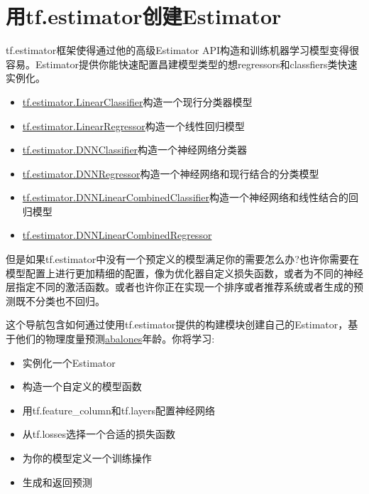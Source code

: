 \section{用tf.estimator创建Estimator}
tf.estimator框架使得通过他的高级Estimator API构造和训练机器学习模型变得很容易。Estimator提供你能快速配置昌建模型类型的想regressors和classfiers类快速实例化。
\begin{itemize}
	\item \href{https://www.tensorflow.org/api_docs/python/tf/estimator/LinearClassifier}{tf.estimator.LinearClassifier}构造一个现行分类器模型
	\item \href{https://www.tensorflow.org/api_docs/python/tf/estimator/LinearRegressor}{tf.estimator.LinearRegressor}构造一个线性回归模型
	\item \href{https://www.tensorflow.org/api_docs/python/tf/estimator/DNNClassifier}{tf.estimator.DNNClassifier}构造一个神经网络分类器
	\item \href{https://www.tensorflow.org/api_docs/python/tf/estimator/DNNRegressor}{tf.estimator.DNNRegressor}构造一个神经网络和现行结合的分类模型
	\item \href{https://www.tensorflow.org/api_docs/python/tf/estimator/DNNLinearCombinedClassifier}{tf.estimator.DNNLinearCombinedClassifier}构造一个神经网络和线性结合的回归模型
	\item \href{https://www.tensorflow.org/api_docs/python/tf/estimator/DNNLinearCombinedRegressor}{tf.estimator.DNNLinearCombinedRegressor}
\end{itemize}
但是如果tf.estimator中没有一个预定义的模型满足你的需要怎么办?也许你需要在模型配置上进行更加精细的配置，像为优化器自定义损失函数，或者为不同的神经层指定不同的激活函数。或者也许你正在实现一个排序或者推荐系统或者生成的预测既不分类也不回归。

这个导航包含如何通过使用tf.estimator提供的构建模块创建自己的Estimator，基于他们的物理度量预测\href{https://en.wikipedia.org/wiki/Abalone}{abalones}年龄。你将学习:
\begin{itemize}
	\item 实例化一个Estimator
	\item 构造一个自定义的模型函数
	\item 用tf.feature\_column和tf.layers配置神经网络
	\item 从tf.losses选择一个合适的损失函数
	\item 为你的模型定义一个训练操作
	\item 生成和返回预测
\end{itemize}
